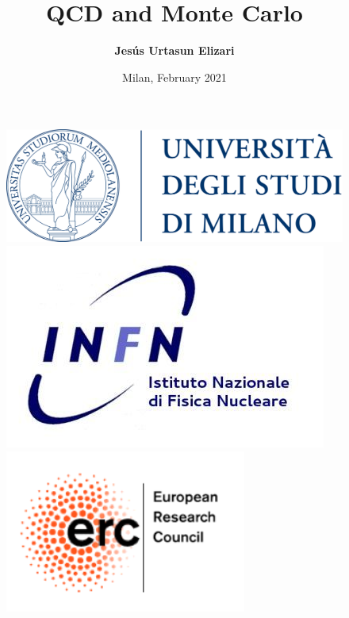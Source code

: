 \documentclass[aspectratio=43]{beamer}
\title[QCD and Monte Carlo]{QCD and Monte Carlo}
\author{\textbf {Jes\'us Urtasun Elizari}}
\date{Milan, February 2021}
\begin{document}
\begin{frame}
	
	\vspace{1.0 cm}
	
	
	\vspace{0.25 cm}

	\begin{figure}
		\includegraphics[width = 3.0 cm]{plots/logo_unimi.png}
		\hfill
		\includegraphics[width = 3.0 cm]{plots/logo_infn.png}
		\hfill
		\includegraphics[width = 3.0 cm]{plots/logo_erc.png}
		\endminipage
	\end{figure}

	\vspace{1.0 cm}

\end{frame}
\end{document}
